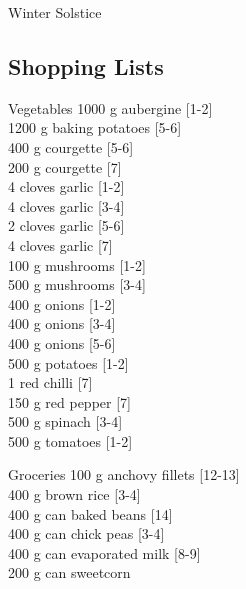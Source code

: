 \begin{menu}{Winter Solstice}
    \subsection*{Shopping Lists}
      \begin{shoppinglist}{Vegetables}
      1000 g aubergine 
        {\scriptsize[1-2]}\\
      1200 g baking potatoes 
        {\scriptsize[5-6]}\\
      400 g courgette 
        {\scriptsize[5-6]}\\
      200 g courgette 
        {\scriptsize[7]}\\
      4 cloves garlic 
        {\scriptsize[1-2]}\\
      4 cloves garlic 
        {\scriptsize[3-4]}\\
      2 cloves garlic 
        {\scriptsize[5-6]}\\
      4 cloves garlic 
        {\scriptsize[7]}\\
      100 g mushrooms 
        {\scriptsize[1-2]}\\
      500 g mushrooms 
        {\scriptsize[3-4]}\\
      400 g onions 
        {\scriptsize[1-2]}\\
      400 g onions 
        {\scriptsize[3-4]}\\
      400 g onions 
        {\scriptsize[5-6]}\\
      500 g potatoes 
        {\scriptsize[1-2]}\\
      1  red chilli 
        {\scriptsize[7]}\\
      150 g red pepper 
        {\scriptsize[7]}\\
      500 g spinach 
        {\scriptsize[3-4]}\\
      500  g tomatoes 
        {\scriptsize[1-2]}\\
      \end{shoppinglist}%
      \begin{shoppinglist}{Groceries}
      100 g anchovy fillets 
        {\scriptsize[12-13]}\\
      400 g brown rice 
        {\scriptsize[3-4]}\\
      400 g can baked beans 
        {\scriptsize[14]}\\
      400 g can chick peas 
        {\scriptsize[3-4]}\\
      400 g can evaporated milk 
        {\scriptsize[8-9]}\\
      200 g can sweetcorn 

\end{shoppinglist}
\end{menu}
